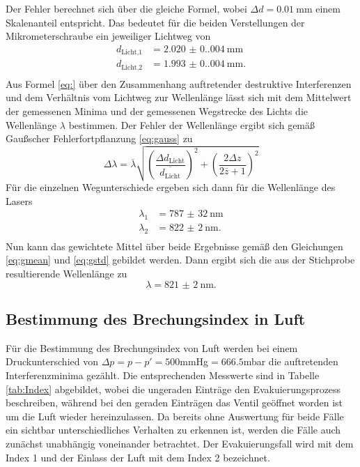 Der Fehler berechnet sich über die gleiche Formel, wobei $\Delta d=\qty{0.01}{\mm}$ einem Skalenanteil entspricht.
Das bedeutet für die beiden Verstellungen der Mikrometerschraube ein jeweiliger Lichtweg von 
\begin{align*}
  d_\text{Licht,1}&=\qty{2.020(0.004)}{\mm}\\
  d_\text{Licht,2}&=\qty{1.993(0.004)}{\mm}.\\
\end{align*}
Aus Formel \eqref{eq:} über den Zusammenhang auftretender destruktive Interferenzen und dem Verhältnis vom Lichtweg zur Wellenlänge lässt sich mit dem Mittelwert der gemessenen Minima und der 
gemessenen Wegstrecke des Lichts die Wellenlänge $\lambda$ bestimmen. Der Fehler der Wellenlänge ergibt sich gemäß Gaußscher Fehlerfortpflanzung \eqref{eq:gauss} zu 
\begin{equation*}
    \Delta \lambda =\overline{\lambda}\sqrt{\left(\frac{\Delta d_\text{Licht}}{\overline{d_\text{Licht}}}\right)^2+\left(\frac{2\Delta z }{2\overline{z}+1}\right)^2}
\end{equation*}
Für die einzelnen Wegunterschiede ergeben sich dann für die Wellenlänge des Lasers 
\begin{align*}
  \lambda_1&=\qty{787(32)}{\nm}\\
  \lambda_2&=\qty{822(2)}{\nm}.\\
\end{align*}
Nun kann das gewichtete Mittel über beide Ergebnisse gemäß den Gleichungen \eqref{eq:gmean} und \eqref{eq:gstd}
gebildet werden. Dann ergibt sich die aus der Stichprobe resultierende Wellenlänge zu 
\begin{equation*}
    \lambda=\qty{821(2)}{\nm}.
\end{equation*}
\subsection{Bestimmung des Brechungsindex in Luft}
Für die Bestimmung des Brechungsindex von Luft werden bei einem Druckunterschied von $\Delta p=p-p'=500$mmHg$=666.5$mbar die 
auftretenden Interferenzminima gezählt. Die entsprechenden Messwerte sind in Tabelle \ref{tab:Index} abgebildet, wobei die ungeraden 
Einträge den Evakuierungsprozess beschreiben, während bei den geraden Einträgen das Ventil geöffnet worden
ist um die Luft wieder hereinzulassen. Da bereits ohne Auswertung für beide Fälle 
ein sichtbar unterschiedliches Verhalten zu erkennen ist, werden die Fälle auch zunächst unabhängig voneinander betrachtet.
Der Evakuierungsfall wird mit dem Index 1 und der Einlass der Luft mit dem Index 2 bezeichnet.

